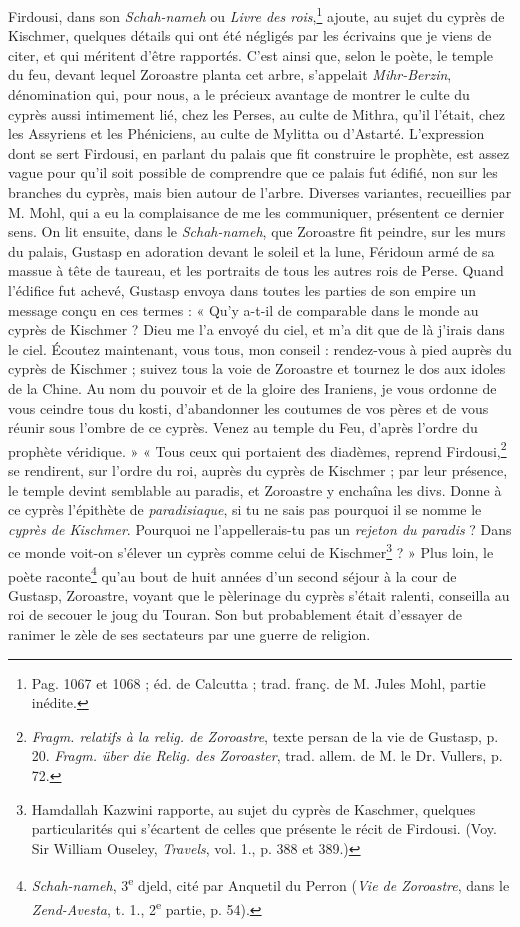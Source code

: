 \documentclass{article}
\begin{document}
Firdousi, dans son \emph{Schah-nameh} ou \emph{Livre des rois},\footnote{Pag. 1067 et 1068 ; éd. de Calcutta ; trad. franç. de M. Jules Mohl, partie inédite.} ajoute, au sujet du cyprès de Kischmer, quelques détails qui ont été négligés par les écrivains que je viens de citer, et qui méritent d'être rapportés. C'est ainsi que, selon le poète, le temple du feu, devant lequel Zoroastre planta cet arbre, s'appelait \emph{Mihr-Berzin}, dénomination qui, pour nous, a le précieux avantage de montrer le culte du cyprès aussi intimement lié, chez les Perses, au culte de Mithra, qu'il l'était, chez les Assyriens et les Phéniciens, au culte de Mylitta ou d'Astarté. L'expression dont se sert Firdousi, en parlant du palais que fit construire le prophète, est assez vague pour qu'il soit possible de comprendre que ce palais fut édifié, non sur les branches du cyprès, mais bien autour de l'arbre. Diverses variantes, recueillies par M. Mohl, qui a eu la complaisance de me les communiquer, présentent ce dernier sens. On lit ensuite, dans le \emph{Schah-nameh}, que Zoroastre fit peindre, sur les murs du palais, Gustasp en adoration devant le soleil et la lune, Féridoun armé de sa massue à tête de taureau, et les portraits de tous les autres rois de Perse. Quand l'édifice fut achevé, Gustasp envoya dans toutes les parties de son empire un message conçu en ces termes : « Qu'y a-t-il de comparable dans le monde au cyprès de Kischmer ? Dieu me l'a envoyé du ciel, et m'a dit que de là j'irais dans le ciel. Écoutez maintenant, vous tous, mon conseil : rendez-vous à pied auprès du cyprès de Kischmer ; suivez tous la voie de Zoroastre et tournez le dos aux idoles de la Chine. Au nom du pouvoir et de la gloire des Iraniens, je vous ordonne de vous ceindre tous du kosti, d'abandonner les coutumes de vos pères et de vous réunir sous l'ombre de ce cyprès. Venez au temple du Feu, d'après l'ordre du prophète véridique. » « Tous ceux qui portaient des diadèmes, reprend Firdousi,\footnote{\emph{Fragm. relatifs à la relig. de Zoroastre}, texte persan de la vie de Gustasp, p. 20. \emph{Fragm. über die Relig. des Zoroaster}, trad. allem. de M. le Dr. Vullers, p. 72.} se rendirent, sur l'ordre du roi, auprès du cyprès de Kischmer ; par leur présence, le temple devint semblable au paradis, et Zoroastre y enchaîna les divs. Donne à ce cyprès l'épithète de \emph{paradisiaque}, si tu ne sais pas pourquoi il se nomme le \emph{cyprès de Kischmer}. Pourquoi ne l'appellerais-tu pas un \emph{rejeton du paradis} ? Dans ce monde voit-on s'élever un cyprès comme celui de Kischmer\footnote{Hamdallah Kazwini rapporte, au sujet du cyprès de Kaschmer, quelques particularités qui s'écartent de celles que présente le récit de Firdousi. (Voy. Sir William Ouseley, \emph{Travels}, vol. 1., p. 388 et 389.)} ? » Plus loin, le poète raconte\footnote{\emph{Schah-nameh}, 3\textsuperscript{e} djeld, cité par Anquetil du Perron (\emph{Vie de Zoroastre}, dans le \emph{Zend-Avesta}, t. 1., 2\textsuperscript{e} partie, p. 54).} qu'au bout de huit années d'un second séjour à la cour de Gustasp, Zoroastre, voyant que le pèlerinage du cyprès s'était ralenti, conseilla au roi de secouer le joug du Touran. Son but probablement était d'essayer de ranimer le zèle de ses sectateurs par une guerre de religion.
\end{document}

